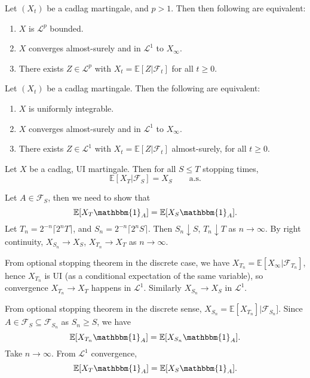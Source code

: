 \documentclass[12pt]{article}
\begin{document}
\begin{theorem}
	Let $(X_t)$ be a cadlag martingale, and $p > 1$. Then then following are equivalent:
	\begin{enumerate}[\normalfont(i)]
		\item $X$ is $\mathcal{L}^p$ bounded.
		\item $X$ converges almost-surely and in $\mathcal{L}^1$ to $X_\infty$.
		\item There exists $Z \in \mathcal{L}^p$ with $X_t = \mathbb{E}[Z | \mathcal{F}_t]$ for all $t \geq 0$.
	\end{enumerate}
\end{theorem}

\begin{theorem}
	Let $(X_t)$ be a cadlag martingale. Then the following are equivalent:
	\begin{enumerate}[\normalfont(i)]
		\item $X$ is uniformly integrable.
		\item $X$ converges almost-surely and in $\mathcal{L}^1$ to $X_\infty$.
		\item There exists $Z \in \mathcal{L}^1$ with $X_t = \mathbb{E}[Z | \mathcal{F}_t]$ almost-surely, for all $t \geq 0$.
	\end{enumerate}
\end{theorem}


\begin{theorem}
	Let $X$ be a cadlag, UI martingale. Then for all $S \leq T$ stopping times,
	\[
		\mathbb{E}[X_T | \mathcal{F}_S] = X_S \qquad\text{a.s.}
	\]
\end{theorem}

\begin{proofbox}
	Let $A \in \mathcal{F}_S$, then we need to show that
	\[
	\mathbb{E}[X_T \mathbbm{1}_{A}] = \mathbb{E}[X_S \mathbbm{1}_{A}].
	\]
	Let $T_n = 2^{-n} \lceil 2^{n} T \rceil$, and $S_n = 2^{-n} \lceil 2^{n} S \rceil$. Then $S_n \downarrow S$, $T_n \downarrow T$ as $n \to \infty$. By right continuity, $X_{S_n} \to X_S$, $X_{T_n} \to X_T$ as $n \to \infty$.

	From optional stopping theorem in the discrete case, we have $X_{T_n} = \mathbb{E}[X_\infty | \mathcal{F}_{T_n}]$, hence $X_{T_n}$ is UI (as a conditional expectation of the same variable), so convergence $X_{T_n} \to X_T$ happens in $\mathcal{L}^1$. Similarly $X_{S_n} \to X_S$ in $\mathcal{L}^1$.

	From optional stopping theorem in the discrete sense, $X_{S_n} = \mathbb{E}[X_{T_n}] | \mathcal{F}_{S_n}]$. Since $A \in \mathcal{F}_S \subseteq \mathcal{F}_{S_n}$ as $S_n \geq S$, we have
	\[
	\mathbb{E}[X_{T_n} \mathbbm{1}_{A}] = \mathbb{E}[X_{S_n} \mathbbm{1}_{A}].
	\]
	Take $n \to \infty$. From $\mathcal{L}^1$ convergence,
	\[
	\mathbb{E}[X_T \mathbbm{1}_{A}] = \mathbb{E}[X_S \mathbbm{1}_{A}].
	\]
\end{proofbox}
\end{document}
